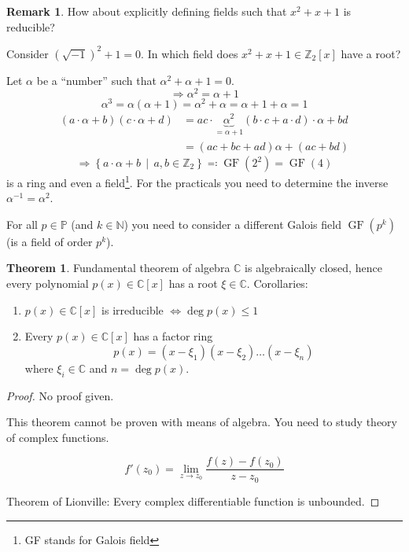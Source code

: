 \documentclass[a4paper,landscape,twocolumn]{article}
\newcommand\setdef[2]{\left\{#1\,\middle|\,#2\right\}}
\theoremstyle{definition}
\newtheorem{theorem}{Theorem}
\newtheorem{rem}{Remark}
\begin{document}
\begin{rem}
  How about explicitly defining fields such that $x^2 + x + 1$ is reducible?

  Consider $(\sqrt{-1})^2 + 1 = 0$.
  In which field does $x^2 + x + 1 \in \mathbb Z_2[x]$ have a root?

  Let $\alpha$ be a \enquote{number} such that $\alpha^2 + \alpha + 1 = 0$.
  \[ \Rightarrow \alpha^2 = \alpha + 1 \]
  \[ \alpha^3 = \alpha (\alpha + 1) = \alpha^2 + \alpha = \alpha + 1 + \alpha = 1 \]
  \begin{align*}
    (a \cdot \alpha + b) (c \cdot \alpha + d)
      &= ac \cdot \underbrace{\alpha^2}_{=\alpha + 1} (b \cdot c + a \cdot d) \cdot \alpha + bd \\
      &= (ac + bc + ad) \alpha + (ac + bd)
  \end{align*}
  \[ \Rightarrow \setdef{a \cdot \alpha + b}{a,b \in \mathbb Z_2} \eqqcolon \operatorname{GF}(2^2) = \operatorname{GF}(4) \]
  is a ring and even a field\footnote{GF stands for Galois field}.
  For the practicals you need to determine the inverse $\alpha^{-1} = \alpha^2$.

  For all $p \in \mathbb P$ (and $k \in \mathbb N$) you need to consider a different Galois field $\operatorname{GF}(p^k)$ (is a field of order $p^k$).
\end{rem}

\begin{theorem}{Fundamental theorem of algebra}
  $\mathbb C$ is algebraically closed,
  hence every polynomial $p(x) \in \mathbb C[x]$ has a root $\xi \in \mathbb C$.
  Corollaries:
  \begin{enumerate}
    \item $p(x) \in \mathbb C[x]$ is irreducible $\Leftrightarrow \deg{p(x)} \leq 1$
    \item Every $p(x) \in \mathbb C[x]$ has a factor ring
      \[ p(x) = (x - \xi_1) (x - \xi_2) \ldots (x - \xi_n) \]
      where $\xi_i \in \mathbb C$ and $n = \deg{p(x)}$.
  \end{enumerate}
\end{theorem}
\begin{proof}
  No proof given.

  This theorem cannot be proven with means of algebra.
  You need to study theory of complex functions.

  \[ f'(z_0) = \lim_{z \to z_0} \frac{f(z) - f(z_0)}{z - z_0} \]

  Theorem of Lionville: Every complex differentiable function is unbounded.
\end{proof}
\end{document}

